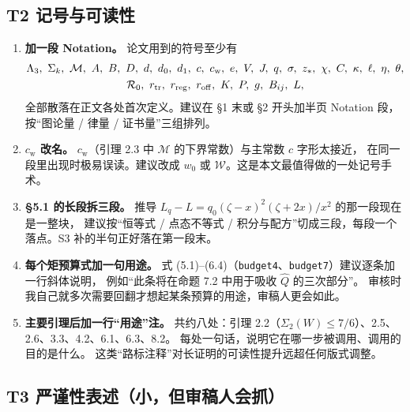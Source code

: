 \documentclass[UTF8,11pt]{ctexart}
\newcommand{\Lam}{\Lambda}
\newcommand{\M}{\mathcal{M}}
\newcommand{\cstar}{c_{\mathrm{w}}}
\newcommand{\file}[1]{\texttt{#1}}
\begin{document}
\subsection{T2 记号与可读性}

\begin{enumerate}[leftmargin=2em,itemsep=4pt]
\item \textbf{加一段 Notation。}
论文用到的符号至少有
\[\begin{gathered}
 \Lam_3,\ \Sigma_k,\ \M,\ A,\ B,\ D,\ d,\ d_0,\ d_1,\ c,\ \cstar,\ e,\ V,\ J,\ q,\ \sigma,\ z_*,\ \chi,\ C,\ \kappa,\ \ell,\ \eta,\ \theta,\\
 \mathcal R_0,\ r_{\rm tr},\ r_{\rm reg},\ r_{\rm off},\ K,\ P,\ g,\ B_{ij},\ L ,
\end{gathered}\]
全部散落在正文各处首次定义。建议在 \S1 末或 \S2 开头加半页 Notation 段，按``图论量 / 律量 / 证书量''三组排列。

\item \textbf{$\cstar$ 改名。}
$c_{\mathrm w}$（引理 2.3 中 $\mathcal M$ 的下界常数）与主常数 $c$ 字形太接近，
在同一段里出现时极易误读。建议改成 $w_0$ 或 $\mathcal W$。这是本文最值得做的一处记号手术。

\item \textbf{\S5.1 的长段拆三段。}
推导 $L_q-L=q_0(\zeta-x)^2(\zeta+2x)/x^2$ 的那一段现在是一整块，
建议按``恒等式 / 点态不等式 / 积分与配方''切成三段，每段一个落点。S3 补的半句正好落在第一段末。

\item \textbf{每个矩预算式加一句用途。}
式 (5.1)--(6.4)（\file{budget4}、\file{budget7}）建议逐条加一行斜体说明，
例如``此条将在命题 7.2 中用于吸收 $\widehat Q$ 的三次部分''。
审核时我自己就多次需要回翻才想起某条预算的用途，审稿人更会如此。

\item \textbf{主要引理后加一行``用途''注。}
共约八处：引理 2.2（$\Sigma_2(W)\le7/6$）、2.5、2.6、3.3、4.2、6.1、6.3、8.2。
每处一句话，说明它在哪一步被调用、调用的目的是什么。
这类``路标注释''对长证明的可读性提升远超任何版式调整。
\end{enumerate}

\subsection{T3 严谨性表述（小，但审稿人会抓）}
\end{document}
